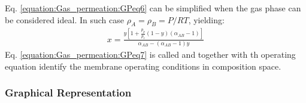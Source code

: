 \documentclass[letterpaper,10pt,english]{jupyterBook}
\begin{document}
\sphinxAtStartPar
Eq. \eqref{equation:Gas_permeation:GPeq6} can be simplified when the gas phase can be considered ideal. In such case \(\rho_A=\rho_B=P/RT\), yielding:
\begin{equation}\label{equation:Gas_permeation:GPeq7}
\begin{split}
x=\frac{y\left[1+\frac{p_p}{p_r}(1-y)\left(\alpha_{AB}-1\right)\right]}{\alpha_{AB}-\left(\alpha_{AB}-1\right)y}
\end{split}
\end{equation}
\sphinxAtStartPar
Eq. \eqref{equation:Gas_permeation:GPeq7} is called  and together with th operating equation identify the membrane operating conditions in composition space.


\subsubsection{Graphical Representation}
\label{\detokenize{Gas_permeation:id1}}
\end{document}
